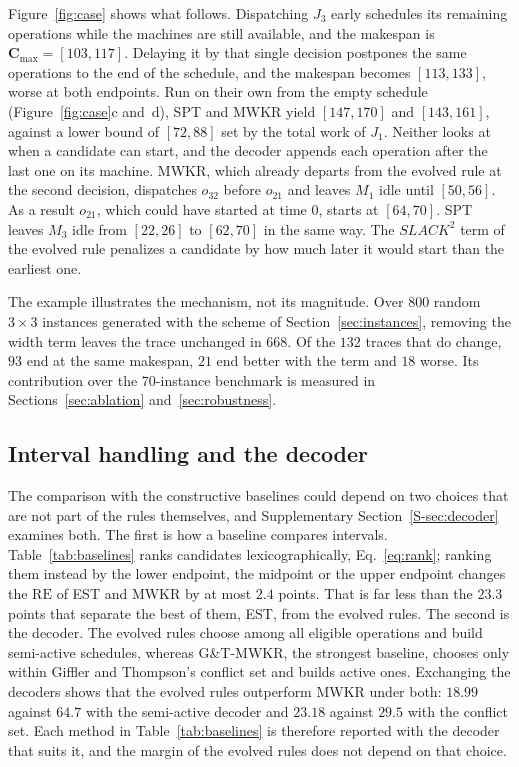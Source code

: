 \documentclass[review,authoryear,11pt]{elsarticle}
\newcommand{\RE}{\mathrm{RE}}
\begin{document}
Figure~\ref{fig:case} shows what follows. Dispatching $J_3$ early schedules its remaining operations
while the machines are still available, and the makespan is
$\mathbf{C}_{\max} = [103,117]$. Delaying it by that single decision
postpones the same operations to the end of the schedule, and the
makespan becomes $[113,133]$, worse at both endpoints. Run on their own
from the empty schedule (Figure~\ref{fig:case}c and~d), SPT and MWKR
yield $[147,170]$ and $[143,161]$, against a lower bound of $[72,88]$
set by the total work of $J_1$. Neither looks at when a candidate can
start, and the decoder appends each operation after the last one on its
machine. MWKR, which already departs from the evolved rule at the second
decision, dispatches $o_{32}$ before $o_{21}$ and leaves $M_1$ idle until
$[50,56]$. As a result $o_{21}$, which could have started at time $0$,
starts at $[64,70]$. SPT leaves $M_3$ idle from $[22,26]$ to $[62,70]$
in the same way. The $\mathit{SLACK}^2$ term of the evolved rule penalizes a candidate by how much later it would start than the earliest one.

The example illustrates the mechanism, not its magnitude. Over $800$
random $3{\times}3$ instances generated with the scheme of
Section~\ref{sec:instances}, removing the width term leaves the trace
unchanged in $668$. Of the $132$ traces that do change, $93$ end at the
same makespan, $21$ end better with the term and $18$ worse. Its
contribution over the 70-instance benchmark is measured in
Sections~\ref{sec:ablation} and~\ref{sec:robustness}.

\subsection{Interval handling and the decoder}
\label{sec:decoder}

The comparison with the constructive baselines could depend on two
choices that are not part of the rules themselves, and Supplementary
Section~\ref{S-sec:decoder} examines both. The first is how a baseline
compares intervals. Table~\ref{tab:baselines} ranks candidates
lexicographically, Eq.~\eqref{eq:rank}; ranking them instead by the
lower endpoint, the midpoint or the upper endpoint changes the $\RE$ of
EST and MWKR by at most $2.4$ points. That is far less than the $23.3$
points that separate the best of them, EST, from the evolved rules. The second
is the decoder. The evolved rules choose among all eligible operations
and build semi-active schedules, whereas G\&T-MWKR, the strongest
baseline, chooses only within Giffler and Thompson's conflict set and
builds active ones. Exchanging the decoders shows that the evolved rules
outperform MWKR under both: $18.99$ against $64.7$ with the semi-active
decoder and $23.18$ against $29.5$ with the conflict set. Each method in
Table~\ref{tab:baselines} is therefore reported with the decoder that
suits it, and the margin of the evolved rules does not depend on that
choice.
\end{document}

